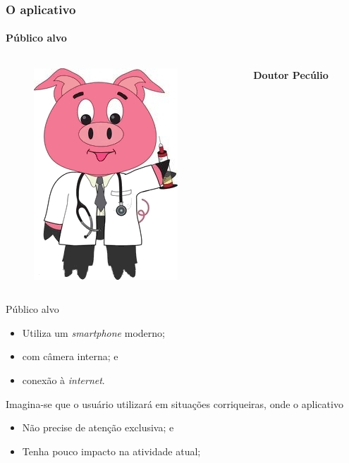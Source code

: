 \documentclass[14pt,beamer]{beamer}
\begin{document}
\begin{frame}
	\frametitle{O aplicativo}
    \framesubtitle{Público alvo}
	
	\vspace{-30px}
	\begin{columns}
		\begin{column}{.3\textwidth}
			\begin{figure}
				\includegraphics[scale=.15]{imagens/docpig}
			\end{figure}
		\end{column}%
		\hfill%
		\begin{column}{9\textwidth}
			\large{\textbf{Doutor Pecúlio}}
		\end{column}%
	\end{columns}
	
    \begin{block}{Público alvo}
        \begin{itemize}
            \item Utiliza um \emph{smartphone} moderno;
            \item com câmera interna; e
            \item conexão à \emph{internet}.
        \end{itemize}
        Imagina-se que o usuário utilizará em situações corriqueiras, 
        onde o aplicativo
        \begin{itemize}
            \item Não precise de atenção exclusiva; e
            \item Tenha pouco impacto na atividade atual;
        \end{itemize}
    \end{block}
\end{frame}
\end{document}
